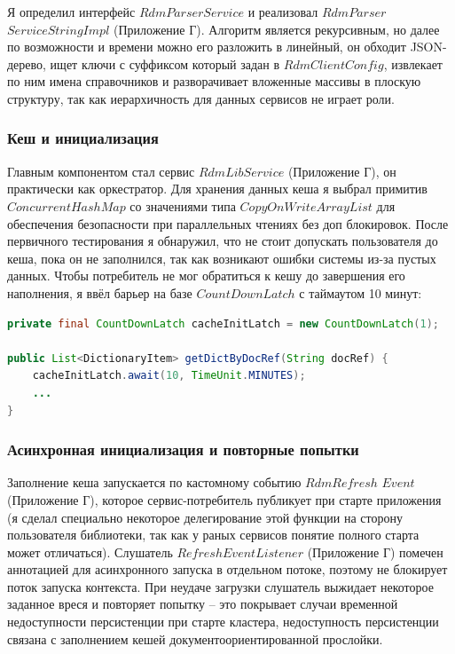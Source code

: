 Я определил интерфейс $RdmParserService$
и реализовал $RdmParser$ $ServiceStringImpl$ (Приложение Г).
Алгоритм является рекурсивным, но далее по возможности и времени можно его разложить в линейный,
он обходит JSON-дерево, ищет ключи с суффиксом который задан в $RdmClientConfig$,
извлекает по ним имена справочников и разворачивает вложенные массивы
в плоскую структуру, так как иерархичность для данных сервисов не играет роли.

\subsubsection{Кеш и инициализация}
Главным компонентом стал сервис $RdmLibService$ (Приложение Г), он практически как оркестратор.
Для хранения данных кеша я выбрал примитив $ConcurrentHashMap$ со значениями
типа $CopyOnWriteArrayList$ для обеспечения безопасности
при параллельных чтениях без доп блокировок. После первичного тестирования я обнаружил, 
что не стоит допускать пользователя до кеша, пока он не заполнился, так как возникают ошибки системы из-за пустых данных.
Чтобы потребитель не мог обратиться к кешу до завершения его наполнения,
я ввёл барьер на базе $CountDownLatch$ с таймаутом 10 минут:

\begin{lstlisting}[language=Java]
private final CountDownLatch cacheInitLatch = new CountDownLatch(1);

public List<DictionaryItem> getDictByDocRef(String docRef) {
    cacheInitLatch.await(10, TimeUnit.MINUTES);
    ...
}
\end{lstlisting}

\subsubsection{Асинхронная инициализация и повторные попытки}
Заполнение кеша запускается по кастомному событию $RdmRefresh$ $Event$
(Приложение Г), которое сервис-потребитель публикует при старте приложения 
(я сделал специально некоторое делегирование этой функции на сторону пользователя библиотеки, так как у раных сервисов понятие полного старта может отличаться).
Слушатель $RefreshEventListener$ (Приложение Г) помечен аннотацией
для асинхронного запуска в отдельном потоке, 
поэтому не блокирует поток запуска контекста.
При неудаче загрузки слушатель выжидает некоторое заданное вреся
и повторяет попытку -- это покрывает случаи временной
недоступности персистенции при старте кластера, 
недоступность персистенции связана с заполнением кешей документоориентированной прослойки.

